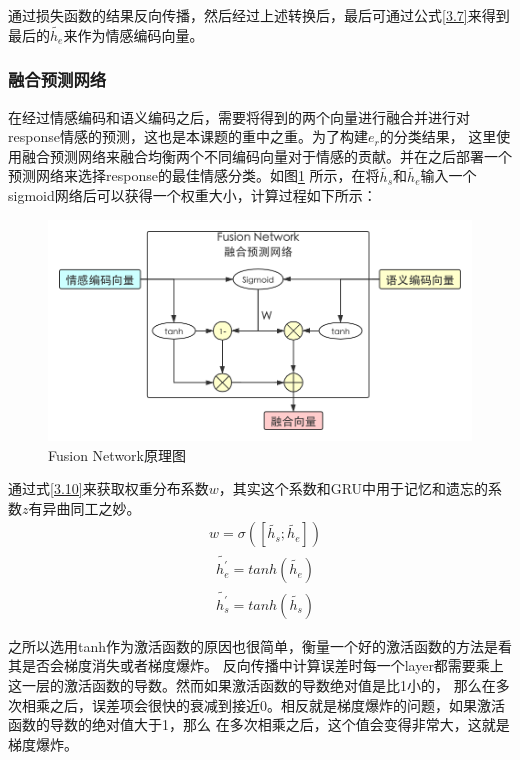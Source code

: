 \documentclass[supercite]{HustGraduPaper}
\theoremstyle{definition}
\begin{document}
通过损失函数的结果反向传播，然后经过上述转换后，最后可通过公式\ref{3.7}来得到最后的$\widetilde{h_e}$来作为情感编码向量。

\subsubsection{融合预测网络}
在经过情感编码和语义编码之后，需要将得到的两个向量进行融合并进行对response情感的预测，这也是本课题的重中之重。为了构建$e_r$的分类结果，
这里使用融合预测网络来融合均衡两个不同编码向量对于情感的贡献。并在之后部署一个预测网络来选择response的最佳情感分类。如图\ref{Fig.fusionnetwork}
所示，在将$\widetilde{h_s}$和$\widetilde{h_e}$输入一个sigmoid网络后可以获得一个权重大小，计算过程如下所示：

\begin{figure}[htbp] %
  \centering %
  \includegraphics[width=1\textwidth]{images/fusionnetwork.png} %
  \caption{Fusion Network原理图} %
  \label{Fig.fusionnetwork} %
\end{figure}
通过式\ref{3.10}来获取权重分布系数$w$，其实这个系数和GRU中用于记忆和遗忘的系数$z$有异曲同工之妙。
\begin{align}
  &w = \sigma([\widetilde{h_s};\widetilde{h_e}]) \label{3.10}
\end{align}
\begin{align}
  &{\widetilde{h_e^{'}}} = tanh(\widetilde{h_e}) \label{3.11}\\
  &{\widetilde{h_s^{'}}} = tanh(\widetilde{h_s}) \label{3.12}
\end{align}

之所以选用tanh作为激活函数的原因也很简单，衡量一个好的激活函数的方法是看其是否会梯度消失或者梯度爆炸。
反向传播中计算误差时每一个layer都需要乘上这一层的激活函数的导数。然而如果激活函数的导数绝对值是比1小的，
那么在多次相乘之后，误差项会很快的衰减到接近0。相反就是梯度爆炸的问题，如果激活函数的导数的绝对值大于1，那么
在多次相乘之后，这个值会变得非常大，这就是梯度爆炸。
\end{document}
